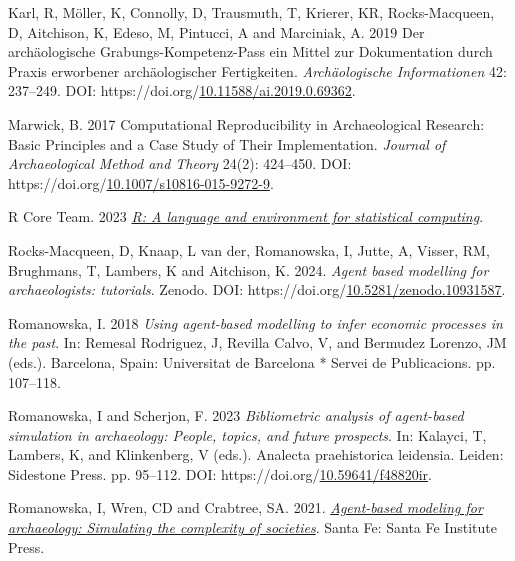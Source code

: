 \documentclass[
]{article}
\newlength{\cslhangindent}
\newlength{\cslentryspacingunit} %
\newenvironment{CSLReferences}[2] %
 {%
  \setlength{\parindent}{0pt}
  \ifodd #1
  \let\oldpar\par
  \def\par{\hangindent=\cslhangindent\oldpar}
  \fi
  \setlength{\parskip}{#2\cslentryspacingunit}
 }%
 {}
\begin{document}
\begin{CSLReferences}{1}{0}
\leavevmode{}%
Karl, R, Möller, K, Connolly, D, Trausmuth, T, Krierer, KR, Rocks-Macqueen, D, Aitchison, K, Edeso, M, Pintucci, A and Marciniak, A. 2019 Der archäologische Grabungs-Kompetenz-Pass {\textendash} ein Mittel zur Dokumentation durch Praxis erworbener archäologischer Fertigkeiten. \emph{Archäologische Informationen} 42: 237--249. DOI: https://doi.org/\href{https://doi.org/10.11588/ai.2019.0.69362}{10.11588/ai.2019.0.69362}.

\leavevmode{}%
Marwick, B. 2017 Computational Reproducibility in Archaeological Research: Basic Principles and a Case Study of Their Implementation. \emph{Journal of Archaeological Method and Theory} 24(2): 424--450. DOI: https://doi.org/\href{https://doi.org/10.1007/s10816-015-9272-9}{10.1007/s10816-015-9272-9}.

\leavevmode{}%
R Core Team. 2023 \emph{\href{https://www.R-project.org/}{R: A language and environment for statistical computing}}.

\leavevmode{}%
Rocks-Macqueen, D, Knaap, L van der, Romanowska, I, Jutte, A, Visser, RM, Brughmans, T, Lambers, K and Aitchison, K. 2024. \emph{Agent based modelling for archaeologists: tutorials}. Zenodo. DOI: https://doi.org/\href{https://doi.org/10.5281/zenodo.10931587}{10.5281/zenodo.10931587}.

\leavevmode{}%
Romanowska, I. 2018 \emph{Using agent-based modelling to infer economic processes in the past}. In: Remesal Rodriguez, J, Revilla Calvo, V, and Bermudez Lorenzo, JM (eds.). Barcelona, Spain: Universitat de Barcelona * Servei de Publicacions. pp. 107--118.

\leavevmode{}%
Romanowska, I and Scherjon, F. 2023 \emph{Bibliometric analysis of agent-based simulation in archaeology: People, topics, and future prospects}. In: Kalayci, T, Lambers, K, and Klinkenberg, V (eds.). Analecta praehistorica leidensia. Leiden: Sidestone Press. pp. 95--112. DOI: https://doi.org/\href{https://doi.org/10.59641/f48820ir}{10.59641/f48820ir}.

\leavevmode{}%
Romanowska, I, Wren, CD and Crabtree, SA. 2021. \emph{\href{https://www.sfipress.org/books/agent-based-modeling-archaeology}{Agent-based modeling for archaeology: Simulating the complexity of societies}}. Santa Fe: Santa Fe Institute Press.


\end{CSLReferences}
\end{document}
